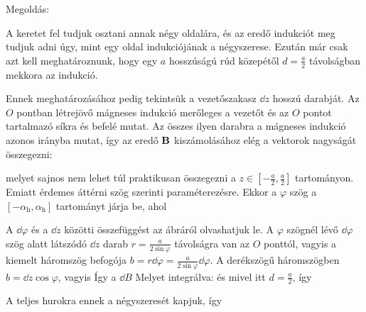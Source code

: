 
\ifdefined\megoldas
  
 Megoldás: 

 A keretet fel tudjuk osztani annak négy oldalára, és az eredő indukciót meg tudjuk adni úgy, mint egy oldal indukciójának a négyszerese. Ezután már csak azt kell meghatároznunk, hogy egy $a$ hosszúságú rúd közepétől $d=\frac{a}{2}$ távolságban mekkora az indukció.

 Ennek meghatározásához pedig tekintsük a vezetőszakasz $\dd z$ hosszú darabját. Az $O$ pontban létrejövő mágneses indukció merőleges a vezetőt és az $O$ pontot tartalmazó síkra és befelé mutat. Az összes ilyen darabra a mágneses indukció azonos irányba mutat, így az eredő $\mathbf{B}$ kiszámolásához elég a vektorok nagyságát összegezni:
 
 
 melyet sajnos nem lehet túl praktikusan összegezni a $z\in\left[-\frac{a}{2},\frac{a}{2}\right]$ tartományon. Emiatt érdemes áttérni szög szerinti paraméterezésre. Ekkor a $\varphi$ szög a $[-\alpha_\text{h},\alpha_\text{h}]$ tartományt járja be, ahol
 

 A $\dd\varphi$ és a $\dd z$ közötti összefüggést az ábráról olvashatjuk le. A $\varphi$ szögnél lévő $\dd\varphi$ szög alatt látszódó $\dd z$ darab $r=\frac{a}{2\sin\varphi}$ távolságra van az $O$ ponttól, vagyis a kiemelt háromszög befogója $b=r\dd\varphi=\frac{a}{2\sin\varphi}\dd\varphi$. A derékszögű háromszögben $b=\dd z\cos\varphi$, vagyis
 Így a $\dd B$
 Melyet integrálva:
 és mivel itt $d=\frac{a}{2}$, így

 A teljes hurokra ennek a négyszeresét kapjuk, így

\fi
